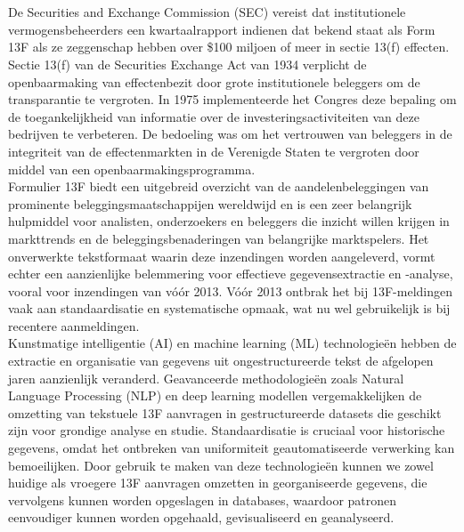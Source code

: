 \chapter{}%
\label{ch:stand-van-zaken}



De Securities and Exchange Commission (SEC) vereist dat institutionele vermogensbeheerders een kwartaalrapport indienen dat bekend staat als Form 13F als ze zeggenschap hebben over \$100 miljoen of meer in sectie 13(f) effecten. Sectie 13(f) van de Securities Exchange Act van 1934 verplicht de openbaarmaking van effectenbezit door grote institutionele beleggers om de transparantie te vergroten. In 1975 implementeerde het Congres deze bepaling om de toegankelijkheid van informatie over de investeringsactiviteiten van deze bedrijven te verbeteren. De bedoeling was om het vertrouwen van beleggers in de integriteit van de effectenmarkten in de Verenigde Staten te vergroten door middel van een openbaarmakingsprogramma\autocite{SECform13F2024}.\\
Formulier 13F biedt een uitgebreid overzicht van de aandelenbeleggingen van prominente beleggingsmaatschappijen wereldwijd en is een zeer belangrijk hulpmiddel voor analisten, onderzoekers en beleggers die inzicht willen krijgen in markttrends en de beleggingsbenaderingen van belangrijke marktspelers. Het onverwerkte tekstformaat waarin deze inzendingen worden aangeleverd, vormt echter een aanzienlijke belemmering voor effectieve gegevensextractie en -analyse, vooral voor inzendingen van vóór 2013. Vóór 2013 ontbrak het bij 13F-meldingen vaak aan standaardisatie en systematische opmaak, wat nu wel gebruikelijk is bij recentere aanmeldingen.\\
Kunstmatige intelligentie (AI) en machine learning (ML) technologieën hebben de extractie en organisatie van gegevens uit ongestructureerde tekst de afgelopen jaren aanzienlijk veranderd. Geavanceerde methodologieën zoals Natural Language Processing (NLP) en deep learning modellen vergemakkelijken de omzetting van tekstuele 13F aanvragen in gestructureerde datasets die geschikt zijn voor grondige analyse en studie. Standaardisatie is cruciaal voor historische gegevens, omdat het ontbreken van uniformiteit geautomatiseerde verwerking kan bemoeilijken. Door gebruik te maken van deze technologieën kunnen we zowel huidige als vroegere 13F aanvragen omzetten in georganiseerde gegevens, die vervolgens kunnen worden opgeslagen in databases, waardoor patronen eenvoudiger kunnen worden opgehaald, gevisualiseerd en geanalyseerd.\\
\\


